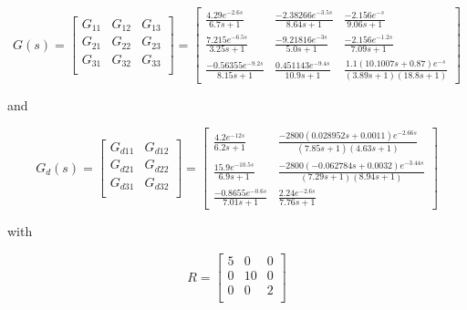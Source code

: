 \begin{equation}
G(s) = \begin{bmatrix}
G_{11} & G_{12} & G_{13} \\
G_{21} & G_{22} & G_{23} \\
G_{31} & G_{32} & G_{33} \\
\end{bmatrix} = \begin{bmatrix}
\frac{4.29e^{-2.6s}}{6.7s+1} & \frac{-2.38266e^{-3.5s}}{8.64s+1} & \frac{-2.156e^{-s}}{9.06s+1} \\
\frac{7.215e^{-6.5s}}{3.25s+1} & \frac{-9.21816e^{-3s}}{5.0s+1} & \frac{-2.156e^{-1.2s}}{7.09s+1} \\
\frac{-0.56355e^{-9.2s}}{8.15s+1} & \frac{0.451143e^{-9.4s}}{10.9s+1} & \frac{1.1(10.1007s+0.87)e^{-s}}{(3.89s+1)(18.8s+1)}
\end{bmatrix}
\end{equation}

and

\begin{equation}
G_d(s) = \begin{bmatrix}
G_{d11} & G_{d12} \\
G_{d21} & G_{d22} \\
G_{d31} & G_{d32} \\
\end{bmatrix} = \begin{bmatrix}
\frac{4.2e^{-12s}}{6.2s+1} & \frac{-2800(0.028952s+0.0011)e^{-2.66s}}{(7.85s+1)(4.63s+1)} \\
\frac{15.9e^{-10.5s}}{6.9s+1} & \frac{-2800(-0.062784s+0.0032)e^{-3.44s}}{(7.29s+1)(8.94s+1)} \\
\frac{-0.8655e^{-0.6s}}{7.01s+1} & \frac{2.24e^{-2.6s}}{7.76s+1}
\end{bmatrix}
\end{equation}

with 

\begin{equation}
R = \begin{bmatrix}
5 & 0 & 0 \\
0 & 10 & 0 \\
0 & 0 & 2 \\
\end{bmatrix}
\end{equation}